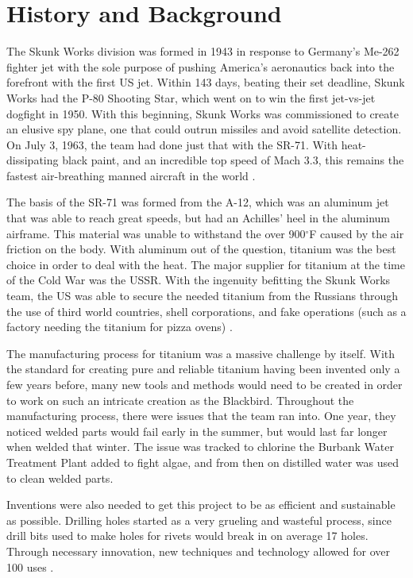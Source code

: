 \documentclass[conf]{new-aiaa}
\begin{document}
\section{History and Background}
The Skunk Works division was formed in 1943 in response to Germany's Me-262 fighter jet with the sole purpose of pushing America's aeronautics back into the forefront with the first US jet. Within 143 days, beating their set deadline, Skunk Works had the P-80 Shooting Star, which went on to win the first jet-vs-jet dogfight in 1950. 
With this beginning, Skunk Works was commissioned to create an elusive spy plane, one that could outrun missiles and avoid satellite detection. On July 3, 1963, the team had done just that with the SR-71. With heat-dissipating black paint, and an incredible top speed of Mach 3.3, this remains the fastest air-breathing manned aircraft in the world \cite{skunkStory}.\par
The basis of the SR-71 was formed from the A-12, which was an aluminum jet that was able to reach great speeds, but had an Achilles' heel in the aluminum airframe. This material was unable to withstand the over 900$^{\circ}$F caused by the air friction on the body. With aluminum out of the question, titanium was the best choice in order to deal with the heat. The major supplier for titanium at the time of the Cold War was the USSR. With the ingenuity befitting the Skunk Works team, the US was able to secure the needed titanium from the Russians through the use of third world countries, shell corporations, and fake operations (such as a factory needing the titanium for pizza ovens) \cite{pizzaSource}.\par
The manufacturing process for titanium was a massive challenge by itself. With the standard for creating pure and reliable titanium having been invented only a few years before, many new tools and methods would need to be created in order to work on such an intricate creation as the Blackbird. Throughout the manufacturing process, there were issues that the team ran into. One year, they noticed welded parts would fail early in the summer, but would last far longer when welded that winter. The issue was tracked to chlorine the Burbank Water Treatment Plant added to fight algae, and from then on distilled water was used to clean welded parts. \par
Inventions were also needed to get this project to be as efficient and sustainable as possible. Drilling holes started as a very grueling and wasteful process, since drill bits used to make holes for rivets would break in on average 17 holes. Through necessary innovation, new techniques and technology allowed for over 100 uses \cite{Titanium}.\par
\end{document}
